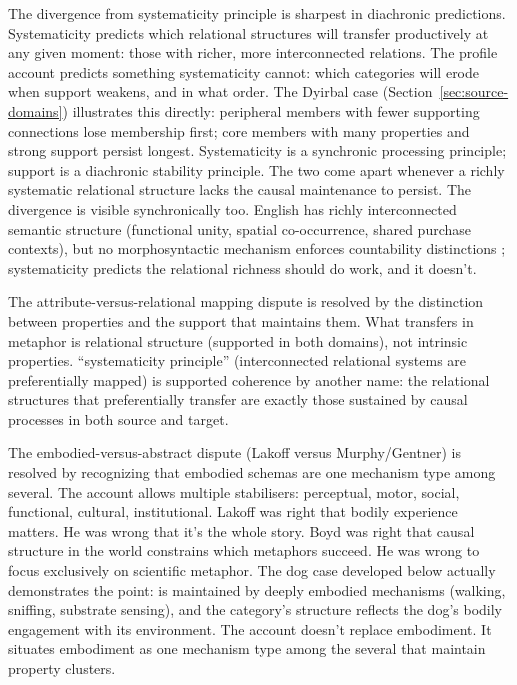 \documentclass[12pt]{article}
\begin{document}
The divergence from  systematicity principle is sharpest in diachronic predictions. Systematicity predicts which relational structures will transfer productively at any given moment: those with richer, more interconnected relations. The profile account predicts something systematicity cannot: which categories will erode when support weakens, and in what order. The Dyirbal case (Section~\ref{sec:source-domains}) illustrates this directly: peripheral members with fewer supporting connections lose membership first; core members with many properties and strong support persist longest. Systematicity is a synchronic processing principle; support is a diachronic stability principle. The two come apart whenever a richly systematic relational structure lacks the causal maintenance to persist. The divergence is visible synchronically too. English  has richly interconnected semantic structure (functional unity, spatial co-occurrence, shared purchase contexts), but no morphosyntactic mechanism enforces countability distinctions \citep[Ch.~9]{reynolds2025hpcbook}; systematicity predicts the relational richness should do work, and it doesn't.

The attribute-versus-relational mapping dispute \citep{murphy1996, gentner1983} is resolved by the distinction between properties and the support that maintains them. What transfers in metaphor is relational structure (supported in both domains), not intrinsic properties. \textcite[163]{gentner1983} \enquote{systematicity principle} (interconnected relational systems are preferentially mapped) is supported coherence by another name: the relational structures that preferentially transfer are exactly those sustained by causal processes in both source and target.

The embodied-versus-abstract dispute (Lakoff versus Murphy/Gentner) is resolved by recognizing that embodied schemas are one mechanism type among several. The account allows multiple stabilisers: perceptual, motor, social, functional, cultural, institutional. Lakoff was right that bodily experience matters. He was wrong that it's the whole story. Boyd was right that causal structure in the world constrains which metaphors succeed. He was wrong to focus exclusively on scientific metaphor. The dog case developed below actually demonstrates the point:  is maintained by deeply embodied mechanisms (walking, sniffing, substrate sensing), and the category's structure reflects the dog's bodily engagement with its environment. The account doesn't replace embodiment. It situates embodiment as one mechanism type among the several that maintain property clusters.
\end{document}
